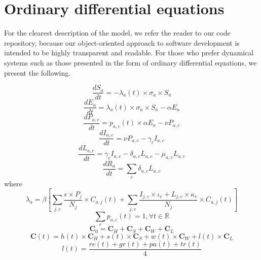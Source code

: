 \section{Ordinary differential equations}

For the clearest description of the model, we refer the reader to our code repository, because our object-oriented approach to software development is intended to be highly transparent and readable. For those who prefer dynamical systems such as those presented in the form of ordinary differential equations, we present the following.

    
    \[\frac{dS_{a}}{dt}=-\lambda_{a}(t)\times\sigma_{a}\times S_{a}\]
    \[\frac{dE_{a}}{dt}=\lambda_{a}(t)\times\sigma_{a}\times S_{a}-\alpha E_{a}\]
    \[\frac{dP_{a,c}}{dt}=p_{a,c}(t)\times \alpha E_{a}-\nu P_{a,c}\]
    \[\frac{dI_{a,c}}{dt}=\nu P_{a,c}-\gamma_{c}I_{a,c}\]
    \[\frac{dL_{a,c}}{dt}=\gamma_{c}I_{a,c}-\delta_{a,c}L_{a,c}-\mu_{a,c}L_{a,c}\]
    \[\frac{dR_{a}}{dt}=\sum_{c}{}\delta_{a,c}L_{a,c}\]
    where
    \[\lambda_{a}=\beta\left[\sum_{j,c}\frac{\epsilon\times P_{j}}{N_{j}}\times C_{a,j}(t)+\sum_{j,c}\frac{I_{j,c}\times\iota_{c}+L_{j,c}\times\kappa_{c}}{N_{j}}\times C_{a,j}(t)\right]\]
    \[\sum_{c}p_{a,c}(t)=1,\forall t\in\mathbb{R}\]
    \[\textbf{C}_{0}=\textbf{C}_{H}+\textbf{C}_{S}+\textbf{C}_{W}+\textbf{C}_{L}\]
    \[\textbf{C}(t)=h(t)\times\textbf{C}_{H}+s(t)\times\textbf{C}_{S}+w(t)\times\textbf{C}_{W}+l(t)\times\textbf{C}_{L}\]
    \[l(t)=\frac{re(t)+gr(t)+pa(t)+tr(t)}{4}\]
